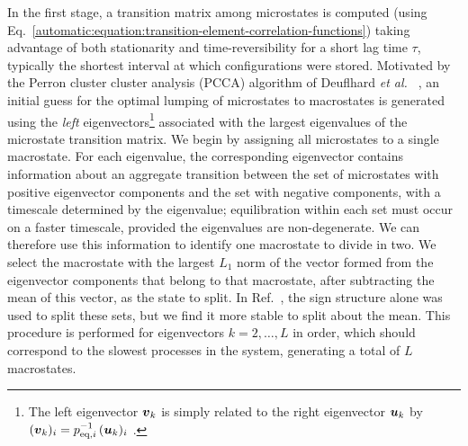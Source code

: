 In the first stage, a transition matrix among microstates is computed (using Eq.\ \ref{automatic:equation:transition-element-correlation-functions}) taking advantage of both stationarity and time-reversibility for a short lag time $\tau$, typically the shortest interval at which configurations were stored.
Motivated by the Perron cluster cluster analysis (PCCA) algorithm of Deuflhard \emph{et al.\ } \cite{deuflhard:2000a}, an initial guess for the optimal lumping of microstates to macrostates is generated using the \emph{left} eigenvectors\footnote{The left eigenvector ${\mbox{\boldmath{$v$}}}_k$ is simply related to the right eigenvector ${\mbox{\boldmath{$u$}}}_k$ by $({\mbox{\boldmath{$v$}}}_k)_i = p_{\mathrm{eq},i}^{-1} \, ({\mbox{\boldmath{$u$}}}_k)_i$ \cite{oppenheim:1977a}.} associated with the largest eigenvalues of the microstate transition matrix.
We begin by assigning all microstates to a single macrostate.
For each eigenvalue, the corresponding eigenvector contains information about an aggregate transition between the set of microstates with positive eigenvector components and the set with negative components, with a timescale determined by the eigenvalue; equilibration within each set must occur on a faster timescale, provided the eigenvalues are non-degenerate.
We can therefore use this information to identify one macrostate to divide in two.
We select the macrostate with the largest $L_1$ norm of the vector formed from the eigenvector components that belong to that macrostate, after subtracting the mean of this vector, as the state to split.
In Ref.\ \cite{deuflhard:2000a}, the sign structure alone was used to split these sets, but we find it more stable to split about the mean.
This procedure is performed for eigenvectors $k = 2,\ldots,L$ in order, which should correspond to the slowest processes in the system, generating a total of $L$ macrostates.


